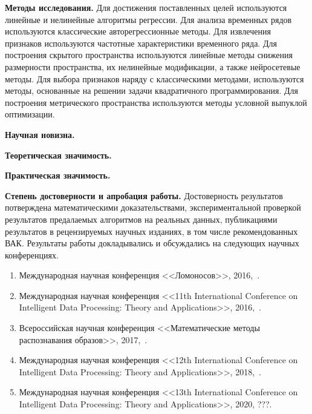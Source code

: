 \vspace{0.5cm}
\textbf{Методы исследования.}
Для достижения поставленных целей используются линейные и нелинейные алгоритмы регрессии.
Для анализа временных рядов используются классические авторегрессионные методы.
Для извлечения признаков используются частотные характеристики временного ряда.
Для построения скрытого пространства используются линейные методы снижения размерности пространства, их нелинейные модификации, а также нейросетевые методы.
Для выбора признаков наряду с классическими методами, используются методы, основанные на решении задачи квадратичного программирования.
Для построения метрического пространства используются методы условной выпуклой оптимизации.

\vspace{0.5cm}
\textbf{Научная новизна.}

\vspace{0.5cm}
\textbf{Теоретическая значимость.}

\vspace{0.5cm}
\textbf{Практическая значимость.}

\vspace{0.5cm}
\textbf{Степень достоверности и апробация работы.}
Достоверность результатов потверждена математическими доказательствами, экспериментальной проверкой результатов предалаемых алгоритмов на реальных данных, публикациями результатов в рецензируемых научных изданиях, в том числе рекомендованных ВАК. 
Результаты работы докладывались и обсуждались на следующих научных конференциях.
\begin{enumerate}
	\item Международная научная конференция <<Ломоносов>>, 2016,~\cite{isachenko2016lomonosov}.
	\item Международная научная конференция  <<11th International Conference on Intelligent Data Processing: Theory and Applications>>, 2016,~\cite{Neychev2016IDP}.
	\item Всероссийская научная конференция <<Математические методы распознавания образов>>, 2017,~\cite{isachenko2017localmmro}.
	\item Международная научная конференция  <<12th International Conference on Intelligent Data Processing: Theory and Applications>>, 2018,~\cite{Isachenko2018plsidp}.
	\item Международная научная конференция  <<13th International Conference on Intelligent Data Processing: Theory and Applications>>, 2020, {\color{red} ???}.
\end{enumerate} 

